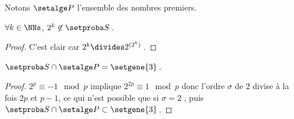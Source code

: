 Notons $\primeset$ l'ensemble des nombres premiers.

\begin{fact}
	$\forall k \in \NNs$, $2^k \not\in \ourset$\,.
\end{fact}

\begin{proof}
	C'est clair car $2^k \divides 2^{(2^k)}$\,.
\end{proof}




\begin{fact}
	$\ourset \cap \primeset = \setgene{3}$\,.
\end{fact}

\begin{proof}
	$2^p \equiv - 1 \mod p$
	implique
	$2^{2p} \equiv 1 \mod p$
	donc l'ordre $\sigma$ de $2$ divise à la fois $2p$ et $p-1$, ce qui n'est possible que si $\sigma = 2$ , puis $\ourset \cap \primeset \subset \setgene{3}$\,.
\end{proof}

